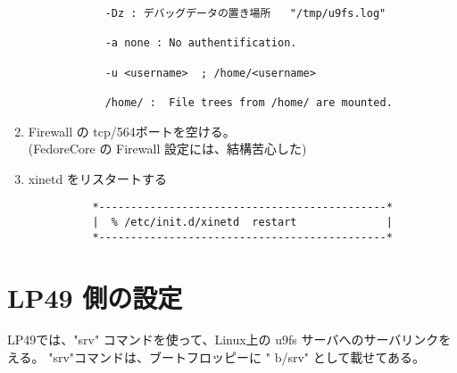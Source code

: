 \begin{enumerate}
\begin{verbatim}
            -Dz : デバッグデータの置き場所   "/tmp/u9fs.log"         
                                                                     
            -a none : No authentification.                           
                                                                     
            -u <username>  ; /home/<username>                        
                                                                     
            /home/ :  File trees from /home/ are mounted.            

\end{verbatim}    

\item  Firewall の tcp/564ボートを空ける。\\

         (FedoreCore の Firewall 設定には、結構苦心した)

\item   xinetd をリスタートする\\

\begin{verbatim}   
          *---------------------------------------------*                             
          |  % /etc/init.d/xinetd  restart              |                         
          *---------------------------------------------*                             
\end{verbatim}    
\end{enumerate}


\section{LP49 側の設定}

      LP49では、"srv" コマンドを使って、Linux上の u9fs サーバへのサーバリンクをえる。
      "srv"コマンドは、ブートフロッピーに " b/srv" として載せてある。

